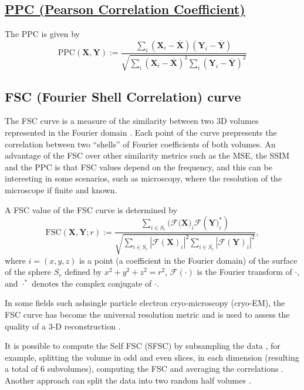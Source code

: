 \documentclass{article}
\begin{document}
\subsection{\href{https://en.wikipedia.org/wiki/Pearson_correlation_coefficient}{PPC
    (Pearson Correlation Coefficient)}}
The PPC is given by
\begin{equation}
  \text{PPC}(\mathbf{X}, \mathbf{Y}) := \frac{\sum_i(\mathbf{X}_i - \overline{\mathbf{X}})(\mathbf{Y}_i - \overline{\mathbf{Y}})}{\sqrt{\sum_i (\mathbf{X}_i - \overline{\mathbf{X}})^2 \sum_i (\mathbf{Y}_i - \overline{\mathbf{Y}})^2}}
\end{equation}

\subsection{FSC (Fourier Shell Correlation) curve}
The FSC curve is a measure of the similarity between two 3D volumes
represented in the Fourier domain \cite{verbeke2024self}. Each point
of the curve prepresents the correlation between two ``shells'' of
Fourier coefficients of both volumes. An advantage of the FSC over
other similarity metrics such as the MSE, the SSIM and the PPC is that
FSC values depend on the frequency, and this can be interesting in
some scenarios, such as microscopy, where the resolution of the
microscope if finite and known.

A FSC value of the FSC curve is determined by~\cite{verbeke2024self}
\begin{equation}
\text{FSC}(\mathbf{X}, \mathbf{Y}; r) := \frac{\sum_{i \in S_r} (\mathcal{F}(\mathbf{X)}_i \mathcal{F}(\mathbf{Y)}_i^*)}{\sqrt{\sum_{i \in S_r} |\mathcal{F}(\mathbf{X})_i|^2 \sum_{i \in S_r} |\mathcal{F}(\mathbf{Y})_i|^2}},
\end{equation}
where $i=(x, y, z)$ is a point (a coefficient in the Fourier domain)
of the surface of the sphere $S_r$ defined by $x^2+y^2+z^2=r^2$,
$\mathcal{F}(\cdot)$ is the Fourier transform of $\cdot$, and
$\cdot^*$ denotes the complex conjugate of $\cdot$.

In some fields such ashsingle particle electron cryo-microscopy
(cryo-EM), the FSC curve has become the universal resolution metric
and is used to assess the quality of a 3-D reconstruction
\cite{rosenthal2003optimal,scheres2012prevention}.

It is possible to compute the Self FSC (SFSC) by subsampling the data
\cite{koho2019fourier}, for example, splitting the volume in odd and
even slices, in each dimension (resulting a total of 6 subvolumes),
computing the FSC and averaging the correlations
\cite{verbeke2024self}. Another approach can split the data into two
random half volumes \cite{verbeke2024self}.




\end{document}
